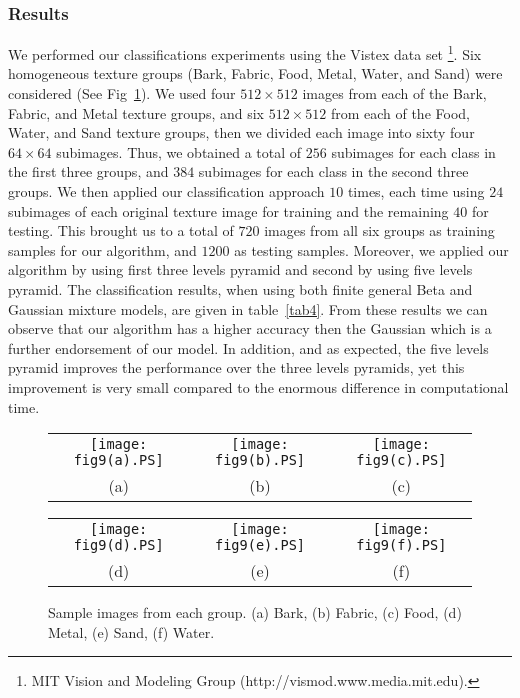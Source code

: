 \documentclass[journal,10pt]{elsart}
\begin{document}
\subsubsection{Results}
We performed our classifications experiments using the Vistex data set \footnote{MIT Vision and Modeling Group (http://vismod.www.media.mit.edu).}.
Six homogeneous texture groups (Bark, Fabric, Food, Metal, Water, and Sand) were considered (See Fig~\ref{fig:2}).
We used four $512\times512$ images from each of the Bark, Fabric, and Metal texture groups, and six $512\times512$ from each of the Food, Water,
and Sand texture groups, then we divided each image into sixty four $64\times64$ subimages.
Thus, we obtained a total of $256$ subimages for each class in the first three groups,
and $384$ subimages for each class in the second three groups.
We then applied our classification approach $10$ times, each time using $24$ subimages of each original texture image
for training and the remaining $40$ for testing.
This brought us to a total of $720$ images from all six groups as training samples for our algorithm,
and $1200$ as testing samples.  Moreover,
we applied our algorithm by using first three levels pyramid and second by using five levels pyramid.
The classification results, when using both finite general Beta and Gaussian mixture models, are given in table~\ref{tab4}.
From these results we can observe that
our algorithm has a higher accuracy then the Gaussian which is a further endorsement of our model.
In addition, and as expected, the five levels pyramid improves the performance over the three levels pyramids,
yet this improvement is very small compared to the enormous difference in computational time.
\begin{figure}[!ht]
\begin{center}
\begin{tabular}{ccc}
\texttt{[image: fig9(a).PS]}
&
\texttt{[image: fig9(b).PS]}
&
\texttt{[image: fig9(c).PS]}\\
(a) & (b) & (c)
\end{tabular}
\begin{tabular}{ccc}
\texttt{[image: fig9(d).PS]}
&\texttt{[image: fig9(e).PS]}
&\texttt{[image: fig9(f).PS]}
\\
(d) & (e) & (f)
\end{tabular}
\caption{Sample images from each group. (a) Bark, (b) Fabric, (c)
Food, (d) Metal, (e) Sand, (f) Water.} \label{fig:2}
\end{center}
\end{figure}
\end{document}
